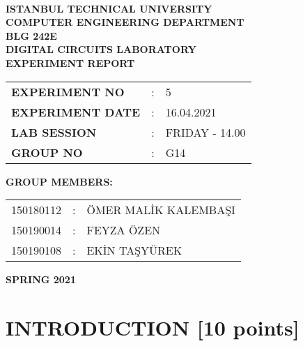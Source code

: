 \documentclass[pdftex,12pt,a4paper]{article}
\begin{document}
\begin{titlepage}
\begin{center}
\textbf{}\\
\textbf{\Large{ISTANBUL TECHNICAL UNIVERSITY}}\\
\vspace{0.5cm}
\textbf{\Large{COMPUTER ENGINEERING DEPARTMENT}}\\
\vspace{2cm}
\textbf{\Large{BLG 242E\\ DIGITAL CIRCUITS LABORATORY\\ EXPERIMENT REPORT}}\\
\vspace{2.8cm}
\begin{table}[ht]
\centering
\Large{
\begin{tabular}{lcl}
\textbf{EXPERIMENT NO}  & : & 5 \\
\textbf{EXPERIMENT DATE}  & : & 16.04.2021 \\
\textbf{LAB SESSION}  & : & FRIDAY - 14.00 \\
\textbf{GROUP NO}  & : & G14 \\
\end{tabular}}
\end{table}
\vspace{1cm}
\textbf{\Large{GROUP MEMBERS:}}\\
\begin{table}[ht]
\centering
\Large{
\begin{tabular}{rcl}
150180112  & : & ÖMER MALİK KALEMBAŞI \\
150190014  & : & FEYZA ÖZEN \\
150190108  & : & EKİN TAŞYÜREK \\
\end{tabular}}
\end{table}
\vspace{2.8cm}
\textbf{\Large{SPRING 2021}}

\end{center}

\end{titlepage}

\thispagestyle{empty}
\setcounter{tocdepth}{4}
\tableofcontents
\clearpage

\setcounter{page}{1}

\section{INTRODUCTION [10 points]}
\end{document}
